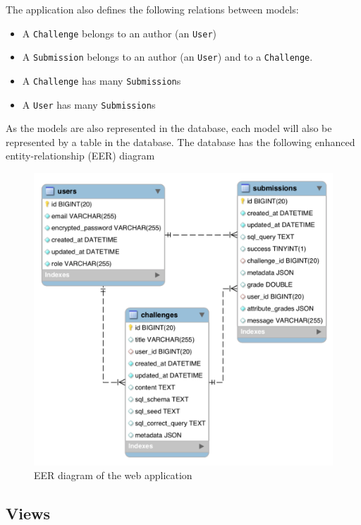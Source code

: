 The application also defines the following relations between models:
\begin{itemize}
    \item A \texttt{Challenge} belongs to an author (an \texttt{User})
    \item A \texttt{Submission} belongs to an author (an \texttt{User}) and to a \texttt{Challenge}.
    \item A \texttt{Challenge} has many \texttt{Submission}s
    \item A \texttt{User} has many \texttt{Submission}s
\end{itemize}

As the models are also represented in the database, each model will also be represented by a table in the database. The database has the following enhanced entity-relationship (EER) diagram

\begin{figure}
    \centering
    \includegraphics[width=\textwidth/8*6]{Chapters/4-Design/database_schema.png}
    \caption{EER diagram of the web application}
\end{figure}

\subsection{Views}

